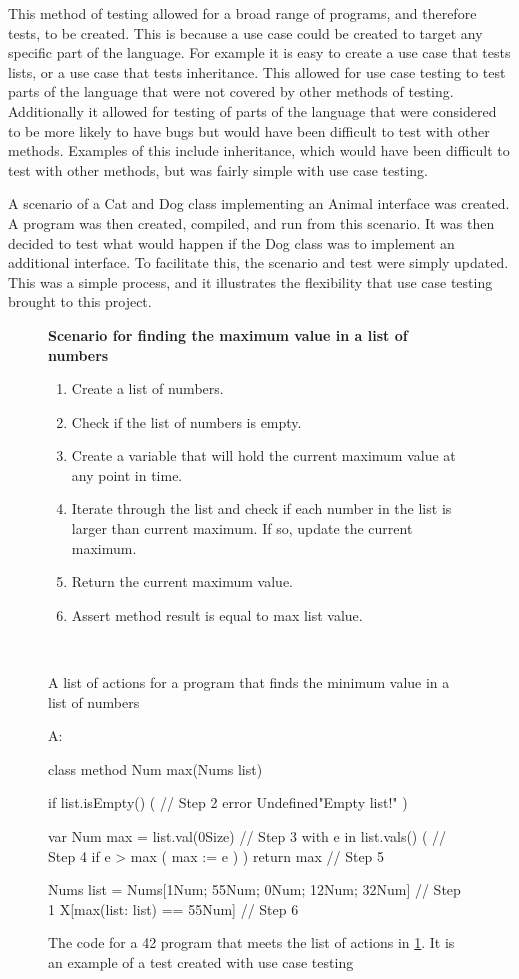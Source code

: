 This method of testing allowed for a broad range of programs, and therefore tests, to be created. This is because a use case could be created to target any specific part of the language. For example it is easy to create a use case that tests lists, or a use case that tests inheritance. This allowed for use case testing to test parts of the language that were not covered by other methods of testing. Additionally it allowed for testing of parts of the language that were considered to be more likely to have bugs but would have been difficult to test with other methods. Examples of this include inheritance, which would have been difficult to test with other methods, but was fairly simple with use case testing. 

A scenario of a Cat and Dog class implementing an Animal interface was created. A program was then created, compiled, and run from this scenario. It was then decided to test what would happen if the Dog class was to implement an additional interface. To facilitate this, the scenario and test were simply updated. This was a simple process, and it illustrates the flexibility that use case testing brought to this project.

\begin{figure}[ht]
	\centering
\textbf{Scenario for finding the maximum value in a list of numbers}
	\begin{enumerate}
		\item{Create a list of numbers.}
		\item{Check if the list of numbers is empty.}
		\item{Create a variable that will hold the current maximum value at any point in time.}
		\item{Iterate through the list and check if each number in the list is larger than current maximum. If so, update the current maximum.}
		\item{Return the current maximum value.}
		\item{Assert method result is equal to max list value.}
	\end{enumerate}
	\caption{A list of actions for a program that finds the minimum value in a list of numbers \label{actions}}
	~\\
	\end{figure}

\begin{figure}[ht]
		\begin{42listing}
		A: {
			class method Num max(Nums list) {
				if list.isEmpty() ( // Step 2
					error Undefined"Empty list!"
				)
				
				var Num max = list.val(0Size) // Step 3
				with e in list.vals() ( // Step 4
					if e > max (
						max := e
					)
				)
				return max // Step 5
			}
			
			Nums list = Nums[1Num; 55Num; 0Num; 12Num; 32Num] // Step 1
			X[max(list: list) == 55Num] // Step 6
		}
		\end{42listing}
		\caption{The code for a 42 program that meets the list of actions in \ref{actions}. It is an example of a test created with use case testing \label{figMax}}
\end{figure}

